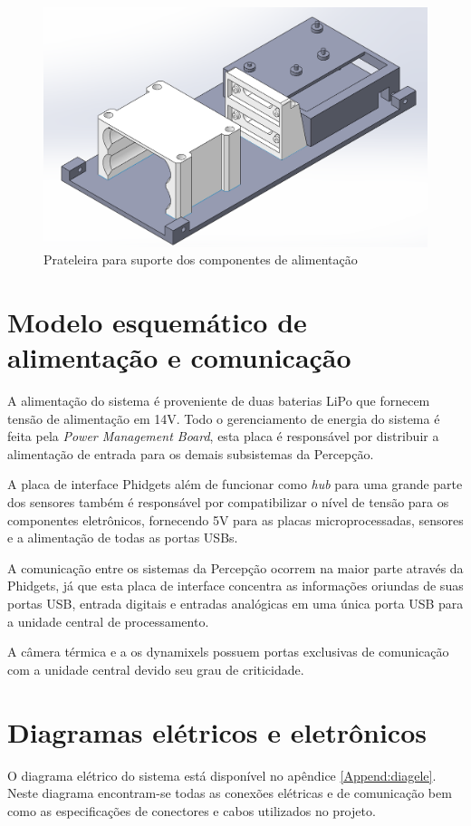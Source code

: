 \begin{itemize}
\begin{figure}[h]
	\centering
	\includegraphics[width=14cm]{Figures/pecadebaixo.png}
	\caption{Prateleira para suporte dos componentes de alimentação} \label{pecaaliment}
\end{figure}

\section{Modelo esquemático de alimentação e comunicação}
\label{sec:modesq}
A alimentação do sistema é proveniente de duas baterias LiPo que fornecem tensão de alimentação em 14V. Todo o gerenciamento de energia do sistema é feita pela \textit{Power Management Board}, esta placa é responsável por distribuir a alimentação de entrada para os demais subsistemas da Percepção. 

A placa de interface Phidgets além de funcionar como \textit{hub} para uma grande parte dos sensores também é responsável por compatibilizar o nível de tensão para os componentes eletrônicos, fornecendo 5V para as placas microprocessadas, sensores e a alimentação de todas as portas USBs. 

A comunicação entre os sistemas da Percepção ocorrem na maior parte  através da Phidgets, já que esta placa de interface concentra as informações oriundas de suas portas USB, entrada digitais e entradas analógicas em uma única porta USB para a unidade central de processamento.

A câmera térmica e a os dynamixels possuem portas exclusivas de comunicação com a unidade central devido seu grau de criticidade.

\section{Diagramas elétricos e eletrônicos}
\label{sec:diage}
O diagrama elétrico do sistema está disponível no apêndice \ref{Append:diagele}. Neste diagrama encontram-se todas as conexões elétricas e de comunicação bem como as especificações de conectores e cabos utilizados no projeto.


\end{itemize}
